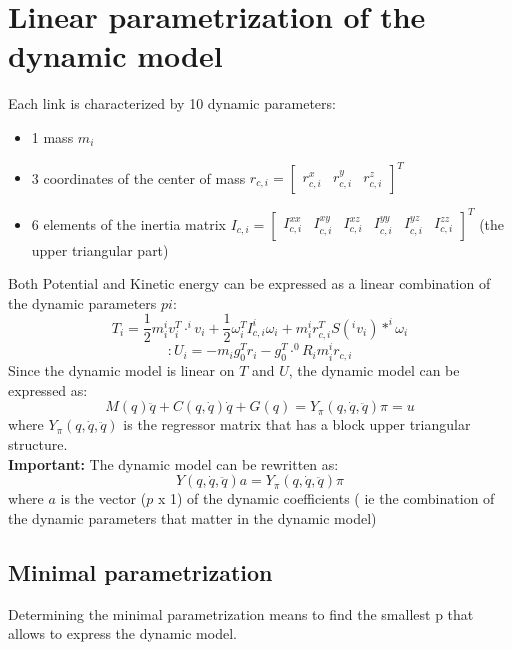 \documentclass[a4paper,12pt]{article}
\begin{document}
\section{Linear parametrization of the dynamic model}
Each link is characterized by 10 dynamic parameters:
\begin{itemize}
    \item 1 mass $m_i$
    \item 3 coordinates of the center of mass $r_{c,i} = \begin{bmatrix}
        r_{c,i}^x & r_{c,i}^y & r_{c,i}^z
    \end{bmatrix} ^T$
    \item 6 elements of the inertia matrix $I_{c,i} = \begin{bmatrix}
        I_{c,i}^{xx} & I_{c,i}^{xy} & I_{c,i}^{xz} & I_{c,i}^{yy} & I_{c,i}^{yz} & I_{c,i}^{zz}
    \end{bmatrix} ^T$ (the upper triangular part)
\end{itemize}
Both Potential and Kinetic energy can be expressed 
as a linear combination of the dynamic parameters $pi$:
\begin{equation}
    T_i= \frac{1}{2}m_i ^iv_i^T \cdot ^i v_i + \frac{1}{2} \omega_i^T I_{c,i} ^i\omega_i + m_i ^ir_{c,i}^T S(^iv_i)*^i\omega_i
\end{equation}
\begin{equation}:
    U_i = -m_i g_0^T r_{i}-g_0^T \cdot ^0R_i m_i ^ir_{c,i}
\end{equation}
Since the dynamic model is linear on $T$ and $U$,
the dynamic model can be expressed as:
\begin{equation}
    M(q) \ddot{q} + C(q, \dot{q}) \dot{q} + G(q) = Y_{\pi}(q,\dot{q},\ddot{q}) \pi=u
\end{equation}
where $Y_{\pi}(q,\dot{q},\ddot{q})$ is the regressor matrix that has a block
upper triangular structure.\\
\textbf{Important:} The dynamic model can be rewritten as:
\begin{equation}
    Y(q,\dot{q},\ddot{q}) a = Y_{\pi}(q,\dot{q},\ddot{q}) \pi
\end{equation}
where $a$ is the vector ($p$ x 1) of the dynamic coefficients ( ie the 
combination of the dynamic parameters that matter in the dynamic model)
\subsection{Minimal parametrization}
Determining the minimal parametrization means to find the
smallest p that allows to express the dynamic model.\\
\end{document}
